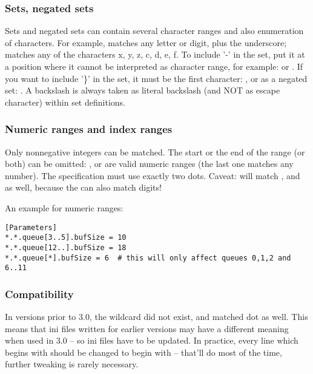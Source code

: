 \subsubsection{Sets, negated sets}

Sets and negated sets can contain several character ranges and also
enumeration of characters. For example,  matches any letter
or digit, plus the underscore;  matches any of the characters
x, y, z, c, d, e, f.
To include '-' in the set, put it at a position where it cannot be
interpreted as character range, for example:  or .
If you want to include '\}' in the set, it must be the first
character: , or as a negated set: . A backslash
is always taken as literal backslash (and NOT as escape character)
within set definitions.


\subsubsection{Numeric ranges and index ranges}

Only nonnegative integers can be matched.  The start or the end of the range
(or both) can be omitted: ,  or 
are valid numeric ranges (the last one matches any number).
The specification must use exactly two dots.
Caveat:  will match ,  and  as well,
because the \ttt{*} can also match digits!

An example for numeric ranges:

\begin{verbatim}
[Parameters]
*.*.queue[3..5].bufSize = 10
*.*.queue[12..].bufSize = 18
*.*.queue[*].bufSize = 6  # this will only affect queues 0,1,2 and 6..11
\end{verbatim}

\subsubsection{Compatibility}

In {\opp} versions prior to 3.0, the \ttt{**} wildcard did not exist, and \ttt{*}
matched dot as well. This means that ini files written for earlier {\opp}
versions may have a different meaning when used in {\opp} 3.0 -- so
ini files have to be updated. In practice, every line which begins
with  should be changed to begin with  -- that'll do most
of the time, further tweaking is rarely necessary.

